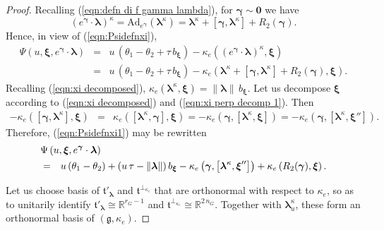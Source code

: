\documentclass[12pt,a4paper]{article}
\theoremstyle{plain}
\theoremstyle{definition}
\begin{document}
\begin{proof}
Recalling (\ref{eqn:defn di f gamma lambda}),
for $\boldsymbol{\gamma}\sim \mathbf{0}$ we have
$$
\left(e^{\boldsymbol{\gamma}}\cdot 
\boldsymbol{\lambda}\right)^\kappa=
\mathrm{Ad}_{e^{\boldsymbol{\gamma}}}(\boldsymbol{\lambda}^\kappa)=
\boldsymbol{\lambda}^\kappa+
\left[\boldsymbol{\gamma},\boldsymbol{\lambda}^\kappa \right]
+R_2(\boldsymbol{\gamma}).
$$
Hence, in view of (\ref{eqn:Psidefnxi}),
\begin{eqnarray}
\label{eqn:Psidefnxi1}
\Psi
\left(u,\boldsymbol{\xi},e^{\boldsymbol{\gamma}}\cdot \boldsymbol{\lambda}\right)
&=&u\,\left(\theta_1-\theta_2+\tau\,b_{\boldsymbol{\xi}} \right)
-\kappa_e\left(
\left(e^{\boldsymbol{\gamma}}\cdot 
\boldsymbol{\lambda}\right)^\kappa,
\boldsymbol{\xi}\right)\\
&=&u\,\left(\theta_1-\theta_2+\tau\,b_{\boldsymbol{\xi}} \right)
-\kappa_e\left(
\boldsymbol{\lambda}^\kappa+
\left[\boldsymbol{\gamma},\boldsymbol{\lambda}^\kappa \right]
+R_2(\boldsymbol{\gamma}),
\boldsymbol{\xi}\right).\nonumber
\end{eqnarray}
Recalling (\ref{eqn:xi decomposed}),
$\kappa_e(\boldsymbol{\lambda}^\kappa,\boldsymbol{\xi})
=\|\boldsymbol{\lambda}\|\,b_{\boldsymbol{\xi}}$.
Let us decompose $\boldsymbol{\xi}$ according to
(\ref{eqn:xi decomposed}) and
(\ref{eqn:xi perp decomp 1}).
Then
\begin{eqnarray*}
-\kappa_e\left(
\left[\boldsymbol{\gamma},\boldsymbol{\lambda}^\kappa \right],
\boldsymbol{\xi}\right)&=&
\kappa_e\left(
\left[\boldsymbol{\lambda}^\kappa ,\boldsymbol{\gamma}\right],
\boldsymbol{\xi}\right)=-\kappa_e\left(\boldsymbol{\gamma},
\left[\boldsymbol{\lambda}^\kappa ,\boldsymbol{\xi}\right]
\right)=-\kappa_e\left(\boldsymbol{\gamma},
\left[\boldsymbol{\lambda}^\kappa ,\boldsymbol{\xi}''\right]
\right).
\end{eqnarray*}
%
Therefore, (\ref{eqn:Psidefnxi1}) may be rewritten
\begin{eqnarray}
\label{eqn:Psidefnxi2}
\lefteqn{\Psi
\left(u,\boldsymbol{\xi},e^{\boldsymbol{\gamma}}\cdot \boldsymbol{\lambda}\right)}\\
&=&u\,(\theta_1-\theta_2)+(u\,\tau
-\|\boldsymbol{\lambda}\|)\,b_{\boldsymbol{\xi}}
-\kappa_e\left(\boldsymbol{\gamma},
\left[\boldsymbol{\lambda}^\kappa ,\boldsymbol{\xi}''\right]
\right)
+\kappa_e\left(
R_2(\boldsymbol{\gamma}),
\boldsymbol{\xi}\right).\nonumber
\end{eqnarray}

Let us choose basis of
$\mathfrak{t}'_{\boldsymbol{\lambda}}$
and $\mathfrak{t}^{\perp_{\kappa_e}}$ that
are orthonormal with respect to $\kappa_e$,
so as to unitarily identify 
$\mathfrak{t}'_{\boldsymbol{\lambda}}
\cong \mathbb{R}^{r_G-1}$ and
$\mathfrak{t}^{\perp_{\kappa_e}}\cong 
\mathbb{R}^{2\,n_G}$. 
Together with $\boldsymbol{\lambda}^\kappa_u$, these 
form an orthonormal basis of $(\mathfrak{g},\kappa_e)$.


\end{proof}
\end{document}
